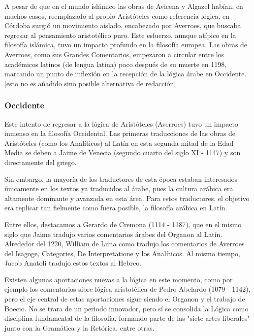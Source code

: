 \documentclass{article}
\begin{document}
A pesar de que en el mundo islámico las obras de Avicena y Algazel habían, en muchos casos, reemplazado al propio Aristóteles como referencia lógica, en Córdoba surgió un movimiento aislado, encabezado por Averroes, que buscaba regresar al pensamiento aristotélico puro. Este esfuerzo, aunque atípico en la filosofía islámica, tuvo un impacto profundo en la filosofía europea. Las obras de Averroes, como sus Grandes Comentarios, empezaron a circular entre los académicos latinos (de lengua latina) poco después de su muerte en 1198, marcando un punto de inflexión en la recepción de la lógica árabe en Occidente\cite{street2001arabic, charles2004latin}. [esto no es añadido sino posible alternativa de redacción]

\subsubsection{Occidente}

Este intento de regresar a la lógica de Aristóteles (Averroes) tuvo un impacto inmenso en la filosofía Occidental. Las primeras traducciones de las obras de Aristóteles (como los Analíticos) al Latín en esta segunda mitad de la Edad Media se deben a Jaime de Venecia (segundo cuarto del siglo XI - 1147) y son directamente del griego.

Sin embargo, la mayoría de los traductores de esta época estaban interesados únicamente en los textos ya traducidos al árabe, pues la cultura arábica era altamente dominante y avanzada en esta área. Para estos traductores, el objetivo era replicar tan fielmente como fuera posible, la filosofía arábica en Latín.

Entre ellos, destacamos a Gerardo de Cremona (1114 - 1187), que en el mismo siglo que Jaime tradujo varios comentarios árabes del Organon al Latín. Alrededor del 1220, William de Luna como tradujo los comentarios de Averroes del Isagoge, Categories, De Interpretatione y los Analíticos. Al mismo tiempo, Jacob Anatoli tradujo estos textos al Hebreo\cite{charles2004latin}.

Existen algunas aportaciones nuevas a la lógica en este momento, como por ejemplo los comentarios sibre lógica aristotélica de Pedro Abelardo (1079 - 1142), pero el eje central de estas aportaciones sigue siendo el Organon y el trabajo de Boecio. No se trara de un periodo innovador, pero sí se consolida la Lógica como disciplina fundamental de la filosofía\cite{marebon2008logic}, formando parte de las "siete artes liberales" junto con la Gramática y la Retórica, entre otras.
\end{document}
